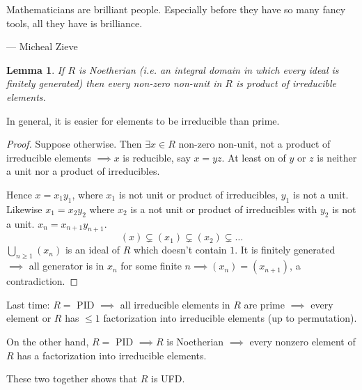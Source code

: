 \documentclass{article}
\newtheorem*{lemma}{Lemma}
\theoremstyle{definition}
\theoremstyle{remark}
\begin{document}

\epigraph{Mathematicians are brilliant people. Especially before they have so many fancy tools, all they have is brilliance.}{--- \textup{Micheal Zieve}}
\bigskip

\begin{lemma}
    If $R$ is Noetherian (i.e. an integral domain in which every ideal is finitely generated) then every non-zero non-unit in $R$ is product of irreducible elements.
\end{lemma}
In general, it is easier for elements to be irreducible than prime.

\begin{proof}
    Suppose otherwise. Then $\exists x \in R$ non-zero non-unit, not a product of irreducible elements $\implies x$ is reducible, say $x = yz$. At least on of $y$ or $z$ is neither a unit nor a product of irreducibles.

    Hence $x = x_1y_1$, where $x_1$ is not unit or product of irreducibles, $y_1$ is not a unit.
    Likewise $x_1 = x_2y_2$ where $x_2$ is a not unit or product of irreducibles with $y_2$ is not a unit. $x_n = x_{n+1}y_{n+1}$.
    \[
        (x) \subsetneq (x_1) \subsetneq (x_2) \subsetneq 
        \ldots
    \]
    $\bigcup_{n \geq 1}(x_n)$ is an ideal of $R$ which doesn't contain $1$. It is finitely generated $\implies$ all generator is in $x_n$ for some finite $n \implies (x_n) = (x_{n+1})$, a contradiction. 
\end{proof}

Last time:
$R = $ PID $\implies$ all irreducible elements in $R$ are prime $\implies$ every element or $R$ has $\leq 1$ factorization into irreducible elements (up to permutation).

On the other hand, $R = $ PID $\implies R$ is Noetherian $\implies$ every nonzero element of $R$ has a factorization into irreducible elements.

These two together shows that $R$ is UFD.
\end{document}

